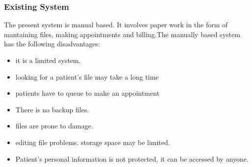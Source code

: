 \documentclass[11 pt]{article}
\begin{document}
\subsubsection{Existing System}
The present system is manual based. It involves paper work in the form of mantaining files, making appointments and billing.The manually based system has the following disadvantages:
\begin{itemize}
\item
it is a limited system.
\item
looking for a patient's file may take a long time
\item
patients have to queue to make an appointment
\item
There is no backup files.
\item
files are prone to damage.
\item
editing file problems.
storage space may be limited.
\item
Patient's personal information is not protected, it can be accessed by anyone.
\end{itemize}
\end{document}
